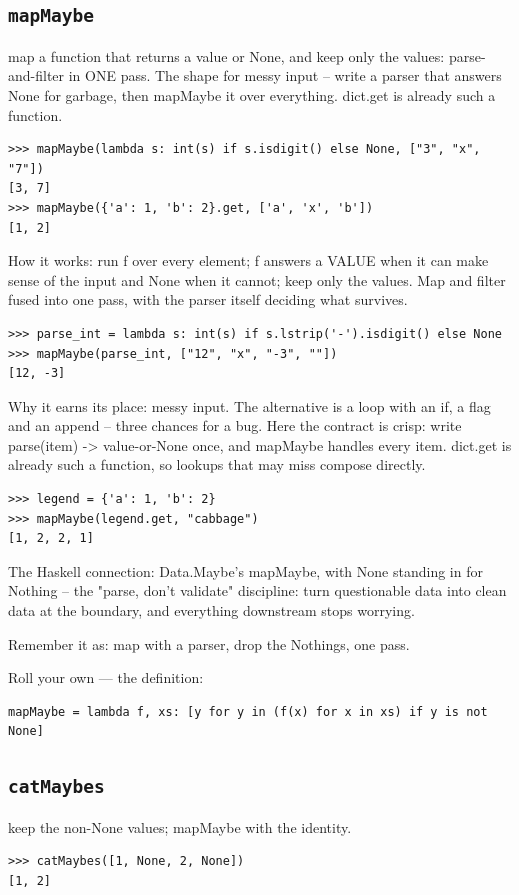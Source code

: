 \documentclass[10pt,letterpaper]{book}
\begin{document}
\subsection{\texttt{mapMaybe}}\label{def:mapMaybe}
map a function that returns a value or None, and keep only the values: parse-and-filter in ONE pass. The shape for messy input -- write a parser that answers None for garbage, then mapMaybe it over everything. dict.get is already such a function.
\begin{lstlisting}[style=ex]
>>> mapMaybe(lambda s: int(s) if s.isdigit() else None, ["3", "x", "7"])
[3, 7]
>>> mapMaybe({'a': 1, 'b': 2}.get, ['a', 'x', 'b'])
[1, 2]
\end{lstlisting}

How it works: run f over every element; f answers a VALUE when it can make sense of the input and None when it cannot; keep only the values. Map and filter fused into one pass, with the parser itself deciding what survives.

\begin{lstlisting}[style=ex]
>>> parse_int = lambda s: int(s) if s.lstrip('-').isdigit() else None
>>> mapMaybe(parse_int, ["12", "x", "-3", ""])
[12, -3]
\end{lstlisting}

Why it earns its place: messy input. The alternative is a loop with an if, a flag and an append -- three chances for a bug. Here the contract is crisp: write parse(item) -> value-or-None once, and mapMaybe handles every item. dict.get is already such a function, so lookups that may miss compose directly.

\begin{lstlisting}[style=ex]
>>> legend = {'a': 1, 'b': 2}
>>> mapMaybe(legend.get, "cabbage")
[1, 2, 2, 1]
\end{lstlisting}

The Haskell connection: Data.Maybe's mapMaybe, with None standing in for Nothing -- the "parse, don't validate" discipline: turn questionable data into clean data at the boundary, and everything downstream stops worrying.


Remember it as: map with a parser, drop the Nothings, one pass.


Roll your own --- the definition:

\begin{lstlisting}[style=ex]
mapMaybe = lambda f, xs: [y for y in (f(x) for x in xs) if y is not None]
\end{lstlisting}
\subsection{\texttt{catMaybes}}\label{def:catMaybes}
keep the non-None values; mapMaybe with the identity.
\begin{lstlisting}[style=ex]
>>> catMaybes([1, None, 2, None])
[1, 2]
\end{lstlisting}
\end{document}
